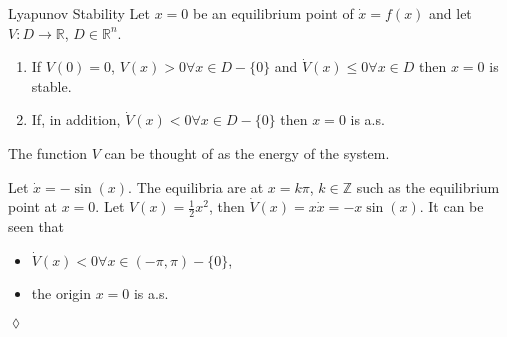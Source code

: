 \begin{theorem}{Lyapunov Stability}
Let $x=0$ be an equilibrium point of $\dot{x}=f(x)$ and let $V:D\to\mathbb{R}$, $D\in\mathbb{R}^n$.
\begin{enumerate}
\item If $V(0)=0$, $V(x)>0 \forall x \in D - \{0\}$ and $\dot{V}(x)\leq0 \forall x\in D$ then $x=0$ is stable.
\item If, in addition, $\dot{V}(x)<0 \forall x\in D-\{0\}$ then $x=0$ is a.s.
\end{enumerate}
\end{theorem}

The function $V$ can be thought of as the energy of the system.

\begin{example}
Let $\dot{x}=-\sin(x)$. The equilibria are at $x=k\pi$, $k\in\mathbb{Z}$ such as the equilibrium point at $x=0$. Let $V(x)=\tfrac{1}{2}x^2$, then $\dot{V}(x)=x\dot{x}=-x\sin(x)$. It can be seen that
\begin{itemize}
\item $\dot{V}(x) < 0 \forall x\in(-\pi,\pi)-\{0\}$,
\item the origin $x=0$ is a.s.
\end{itemize}
$\lozenge$
\end{example}

